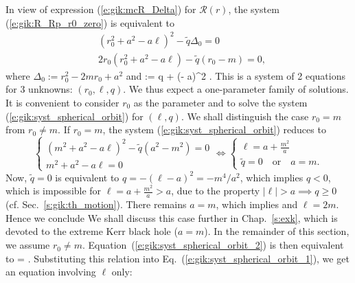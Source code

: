 In view of expression (\ref{e:gik:mcR_Delta}) for $\mathcal{R}(r)$, the system
(\ref{e:gik:R_Rp_r0_zero}) is equivalent to
\begin{subequations}
\label{e:gik:syst_spherical_orbit}
\begin{align}
    &(r_0^2 + a^2 - a \ell)^2 - \tilde{q} \Delta_0 = 0  \label{e:gik:syst_spherical_orbit_1} \\
    & 2 r_0 (r_0^2 + a^2 - a \ell) - \tilde{q} (r_0 - m) = 0 , \label{e:gik:syst_spherical_orbit_2}
\end{align}
\end{subequations}
where $\Delta_0 := r_0^2 - 2 m r_0 + a^2$ and
\be \label{e:gik:def_tq}
     := q + (\ell - a)^2 .
\ee
This is a system of 2 equations for 3 unknowns: $(r_0,\ell,q)$. We thus
expect a one-parameter family of solutions. It is convenient to consider
$r_0$ as the parameter and to solve the system (\ref{e:gik:syst_spherical_orbit})
for $(\ell,q)$.
We shall distinguish the case $r_0 = m$ from $r_0 \neq m$.
If $r_0 = m$, the system (\ref{e:gik:syst_spherical_orbit}) reduces to
\[
\left\{\begin{array}{l}
    (m^2 + a^2 - a \ell)^2 - \tilde{q} (a^2 - m^2) = 0 \\
    m^2 + a^2 - a \ell = 0
\end{array}
\right.
\iff
\left\{\begin{array}{l}
    \ell = a + \frac{m^2}{a}\\
    \tilde{q} = 0 \quad\mbox{or}\quad a = m .
\end{array}
\right.
\]
Now, $\tilde{q} = 0$ is equivalent to $q = - (\ell - a)^2 = - m^4 / a^2$,
which implies $q< 0$, which is impossible for $\ell = a + \frac{m^2}{a} > a$,
due to the property $|\ell| > a \implies q \geq 0$ (cf. Sec.~\ref{s:gik:th_motion}).
There remains $a = m$, which implies and $\ell = 2 m$. Hence we conclude
\be \label{e:gik:spher_orb_r0_eq_m}
\ee
We shall discuss this case further in Chap.~\ref{s:exk}, which is devoted
to the extreme Kerr black hole ($a=m$).
In the remainder of this section, we assume $r_0 \neq m$.
Equation~(\ref{e:gik:syst_spherical_orbit_2}) is then equivalent to
\be \label{e:gik:spher_tq_sol}
     =  .
\ee
Substituting this relation into Eq.~(\ref{e:gik:syst_spherical_orbit_1}), we get
an equation involving $\ell$ only:
